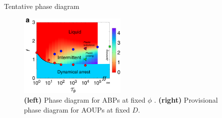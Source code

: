 \documentclass{beamer}
\begin{document}
\begin{frame}{Tentative phase diagram}

\begin{figure}
\centering
\includegraphics[height=4cm]{mandal2020_fig1a.png}

\caption{{\bf (left)} Phase diagram for ABPs at fixed $\phi$ . {\bf (right)} Provisional phase diagram for AOUPs at fixed $D$.}
\end{figure}

\end{frame}
\end{document}
